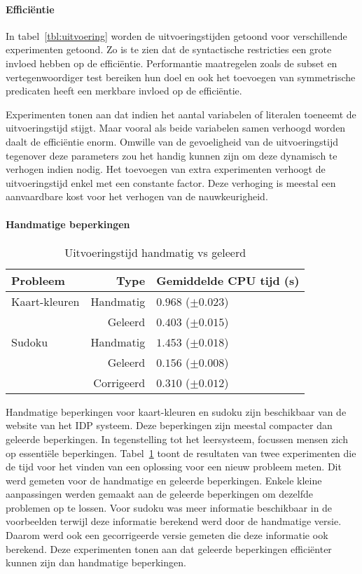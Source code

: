 \paragraph{Effici\"entie}
In tabel~\ref{tbl:uitvoering} worden de uitvoeringstijden getoond voor verschillende experimenten getoond.
Zo is te zien dat de syntactische restricties een grote invloed hebben op de effici\"entie.
Performantie maatregelen zoals de subset en vertegenwoordiger test bereiken hun doel en ook het toevoegen van symmetrische predicaten heeft een merkbare invloed op de effici\"entie.

Experimenten tonen aan dat indien het aantal variabelen of literalen toeneemt de uitvoeringstijd stijgt.
Maar vooral als beide variabelen samen verhoogd worden daalt de effici\"entie enorm.
Omwille van de gevoeligheid van de uitvoeringstijd tegenover deze parameters zou het handig kunnen zijn om deze dynamisch te verhogen indien nodig.
Het toevoegen van extra experimenten verhoogt de uitvoeringstijd enkel met een constante factor.
Deze verhoging is meestal een aanvaardbare kost voor het verhogen van de nauwkeurigheid.

\paragraph{Handmatige beperkingen}
  \begin{table}[!htp]
    \caption{Uitvoeringstijd handmatig vs geleerd}
    \begin{tabularx}{\linewidth}{lr|X}
      \textbf{Probleem} & \textbf{Type} & \textbf{Gemiddelde CPU tijd (s)} \\
      \toprule
      Kaart-kleuren & Handmatig & $0.968$  ($\pm 0.023$) \\
      & Geleerd & $0.403$       ($\pm 0.015$) \\
      \midrule
      Sudoku & Handmatig & $1.453$    ($\pm 0.018$) \\ 
      & Geleerd & $0.156$       ($\pm 0.008$) \\
      & Corrigeerd & $0.310$       ($\pm 0.012$)
    \end{tabularx}
    \label{tbl:mens}
  \end{table}
Handmatige beperkingen voor kaart-kleuren en sudoku zijn beschikbaar van de website van het IDP systeem.
Deze beperkingen zijn meestal compacter dan geleerde beperkingen.
In tegenstelling tot het leersysteem, focussen mensen zich op essenti\"ele beperkingen.
Tabel~\ref{tbl:mens} toont de resultaten van twee experimenten die de tijd voor het vinden van een oplossing voor een nieuw probleem meten.
Dit werd gemeten voor de handmatige en geleerde beperkingen.
Enkele kleine aanpassingen werden gemaakt aan de geleerde beperkingen om dezelfde problemen op te lossen.
Voor sudoku was meer informatie beschikbaar in de voorbeelden terwijl deze informatie berekend werd door de handmatige versie.
Daarom werd ook een gecorrigeerde versie gemeten die deze informatie ook berekend.
Deze experimenten tonen aan dat geleerde beperkingen effici\"enter kunnen zijn dan handmatige beperkingen.

